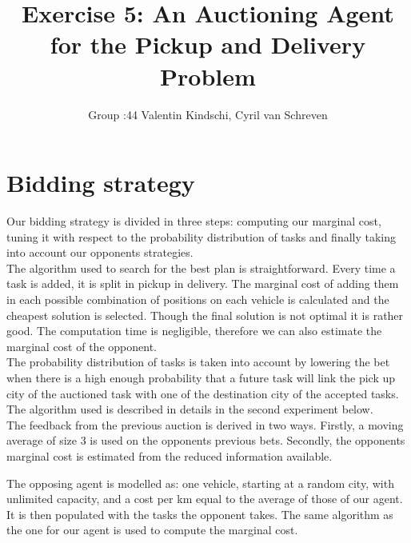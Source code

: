\documentclass[11pt]{article}
\title{\bf Exercise 5: An Auctioning Agent for the Pickup and Delivery Problem}
\author{Group \textnumero:44 Valentin Kindschi, Cyril van Schreven}
\begin{document}
\maketitle

\section{Bidding strategy}

Our bidding strategy is divided in three steps: computing our marginal cost, tuning it with respect to the probability distribution of tasks and finally taking into account our opponents strategies.\\

The algorithm used to search for the best plan is straightforward. Every time a task is added, it is split in pickup in delivery. The marginal cost of adding them in each possible combination of positions on each vehicle is calculated and the cheapest solution is selected. Though the final solution is not optimal it is rather good. The computation time is negligible, therefore we can also estimate the marginal cost of the opponent.\\

The probability distribution of tasks is taken into account by lowering the bet when there is a high enough probability that a future task will link the pick up city of the auctioned task with one of the destination city of the accepted tasks. The algorithm used is described in details in the second experiment below.\\

The feedback from the previous auction is derived in two ways. Firstly, a moving average of size 3 is used on the opponents previous bets. Secondly, the opponents marginal cost is estimated from the reduced information available.

The opposing agent is modelled as: one vehicle, starting at a random city, with unlimited capacity, and a cost per km equal to the average of those of our agent. It is then populated with the tasks the opponent takes. The same algorithm as the one for our agent is used to compute the marginal cost. 
\end{document}
